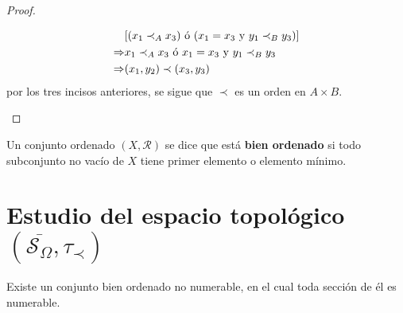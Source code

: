 \documentclass[12pt]{report}
\theoremstyle{largebreak}
\newcommand{\Cls}[1]{\ensuremath{\overline{#1}}}
\begin{document}
\begin{proof}
\begin{enumerate}
\begin{equation*}
\begin{split}
                    &[(x_1\prec_A x_3)\textup{ ó }(x_1=x_3 \textup{ y } y_1\prec_B y_3)]\\
                    \Rightarrow &x_1\prec_A x_3\textup{ ó }x_1=x_3 \textup{ y } y_1\prec_B y_3\\
                    \Rightarrow &(x_1,y_2)\prec (x_3,y_3)\\
                \end{split}
            \end{equation*}
            por los tres incisos anteriores, se sigue que $\prec$ es un orden en $A\times B$.
        \end{enumerate}
    \end{proof}

    \begin{mydef}
        Un conjunto ordenado $(X,\mathcal{R})$ se dice que está \textbf{bien ordenado} si todo subconjunto no vacío de $X$ tiene primer elemento o elemento mínimo.
    \end{mydef}

    \section{Estudio del espacio topológico $(\Cls{\mathcal{S}_\Omega},\tau_\prec)$}

    \begin{propo}
        Existe un conjunto bien ordenado no numerable, en el cual toda sección de él es numerable.
    \end{propo}
\end{document}

